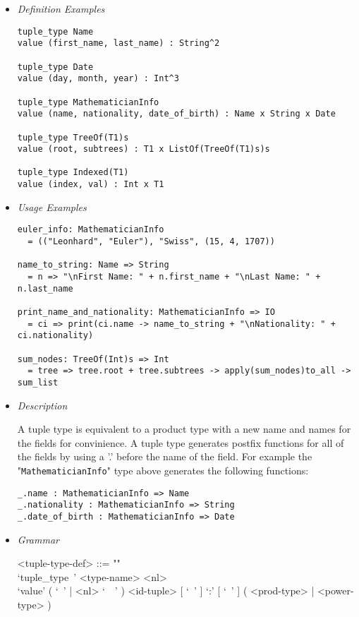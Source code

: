 \documentclass{article}
\begin{document}
\begin{itemize}
\item \textit{Definition Examples}

\begin{verbatim}
tuple_type Name
value (first_name, last_name) : String^2

tuple_type Date
value (day, month, year) : Int^3

tuple_type MathematicianInfo
value (name, nationality, date_of_birth) : Name x String x Date

tuple_type TreeOf(T1)s
value (root, subtrees) : T1 x ListOf(TreeOf(T1)s)s

tuple_type Indexed(T1)
value (index, val) : Int x T1
\end{verbatim}

\item \textit{Usage Examples}

\begin{verbatim}
euler_info: MathematicianInfo
  = (("Leonhard", "Euler"), "Swiss", (15, 4, 1707))

name_to_string: Name => String
  = n => "\nFirst Name: " + n.first_name + "\nLast Name: " + n.last_name

print_name_and_nationality: MathematicianInfo => IO
  = ci => print(ci.name -> name_to_string + "\nNationality: " + ci.nationality)

sum_nodes: TreeOf(Int)s => Int
  = tree => tree.root + tree.subtrees -> apply(sum_nodes)to_all -> sum_list
\end{verbatim}

\item \textit{Description}

A tuple type is equivalent to a product type with a new name  and names for the
fields for convinience. A tuple type generates postfix functions for all of
the fields by using a '.' before the name of the field. For example the
"\verb|MathematicianInfo|" type above generates the following functions:
\begin{verbatim}
_.name : MathematicianInfo => Name
_.nationality : MathematicianInfo => String
_.date_of_birth : MathematicianInfo => Date
\end{verbatim}

\newpage

\item \textit{Grammar}

\begin{grammar}
<tuple-type-def> ::= ""\\
`tuple_type\ ' <type-name> <nl> \\
`value' ( `\ ' | <nl> `\ \ ' )
<id-tuple> [ `\ ' ] `:' [ `\ ' ] ( <prod-type> | <power-type> )


\end{grammar}
\end{itemize}
\end{document}
